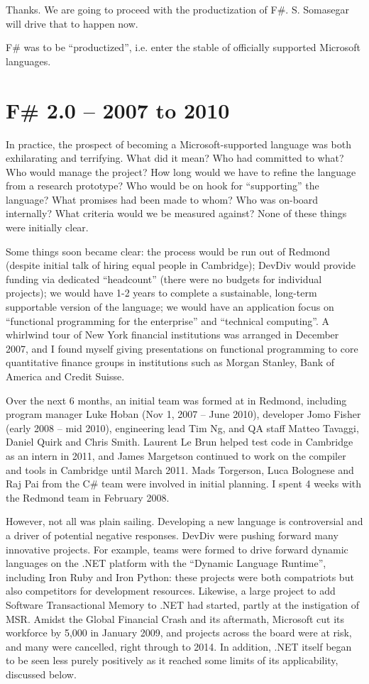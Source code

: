 \documentclass[acmsmall,review]{acmart}\settopmatter{printfolios=true,printccs=false,printacmref=false}
\begin{document}
\begin{verbquote}
Thanks.  We are going to proceed with the productization of F\#.  S. Somasegar will drive that to happen now.   
\end{verbquote}
F\# was to be “productized”, i.e. enter the stable of officially supported Microsoft languages.

\section*{F\# 2.0 – 2007 to 2010}

In practice, the prospect of becoming a Microsoft-supported language was both exhilarating and terrifying.  What did it mean? Who had committed to what?  Who would manage the project? How long would we have to refine the language from a research prototype?  Who would be on hook for “supporting” the language? What promises had been made to whom? Who was on-board internally? What criteria would we be measured against?  None of these things were initially clear.  

Some things soon became clear: the process would be run out of Redmond (despite initial talk of hiring equal people in Cambridge); DevDiv would provide funding via dedicated “headcount” (there were no budgets for individual projects); we would have 1-2 years to complete a sustainable, long-term supportable version of the language; we would have an application focus on “functional programming for the enterprise” and “technical computing”. A whirlwind tour of New York financial institutions was arranged in December 2007, and I found myself giving presentations on functional programming to core quantitative finance groups in institutions such as Morgan Stanley, Bank of America and Credit Suisse.   

Over the next 6 months, an initial team was formed at in Redmond, including program manager Luke Hoban  (Nov 1, 2007 – June 2010), developer Jomo Fisher (early 2008 – mid 2010), engineering lead Tim Ng, and QA staff Matteo Tavaggi, Daniel Quirk and Chris Smith.  Laurent Le Brun helped test code in Cambridge as an intern in 2011, and James Margetson continued to work on the compiler and tools in Cambridge until March 2011.  Mads Torgerson, Luca Bolognese and Raj Pai from the C\# team were involved in initial planning. I spent 4 weeks with the Redmond team in February 2008.

However, not all was plain sailing.  Developing a new language is controversial and a driver of potential negative responses. DevDiv were pushing forward many innovative projects. For example, teams were formed to drive forward dynamic languages on the .NET platform with the “Dynamic Language Runtime”, including Iron Ruby and Iron Python: these projects were both compatriots but also competitors for development resources. Likewise, a large project to add Software Transactional Memory to .NET had started, partly at the instigation of MSR. Amidst the Global Financial Crash and its aftermath, Microsoft cut its workforce by 5,000 in January 2009, and projects across the board were at risk, and many were cancelled, right through to 2014.        In addition, .NET itself began to be seen less purely positively as it reached some limits of its applicability, discussed below.
\end{document}
